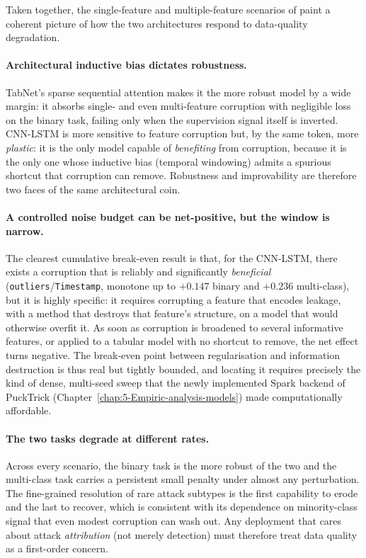 \documentclass[../main.tex]{subfiles}
\begin{document}
Taken together, the single-feature and multiple-feature scenarios of  paint a coherent picture of how the two architectures respond to data-quality degradation.

\paragraph{Architectural inductive bias dictates robustness.}
TabNet's sparse sequential attention makes it the more robust model by a wide margin: it absorbs single- and even multi-feature corruption with negligible loss on the binary task, failing only when the supervision signal itself is inverted. CNN-LSTM is more sensitive to feature corruption but, by the same token, more \emph{plastic}: it is the only model capable of \emph{benefiting} from corruption, because it is the only one whose inductive bias (temporal windowing) admits a spurious shortcut that corruption can remove. Robustness and improvability are therefore two faces of the same architectural coin.

\paragraph{A controlled noise budget can be net-positive, but the window is narrow.}
The clearest cumulative break-even result is that, for the CNN-LSTM, there exists a corruption that is reliably and significantly \emph{beneficial} (\texttt{outliers}/\texttt{Timestamp}, monotone up to $+0.147$ binary and $+0.236$ multi-class), but it is highly specific: it requires corrupting a feature that encodes leakage, with a method that destroys that feature's structure, on a model that would otherwise overfit it. As soon as corruption is broadened to several informative features, or applied to a tabular model with no shortcut to remove, the net effect turns negative. The break-even point between regularisation and information destruction is thus real but tightly bounded, and locating it requires precisely the kind of dense, multi-seed sweep that the newly implemented Spark backend of PuckTrick (Chapter~\ref{chap:5-Empiric-analysis-models}) made computationally affordable.

\paragraph{The two tasks degrade at different rates.}
Across every scenario, the binary task is the more robust of the two and the multi-class task carries a persistent small penalty under almost any perturbation. The fine-grained resolution of rare attack subtypes is the first capability to erode and the last to recover, which is consistent with its dependence on minority-class signal that even modest corruption can wash out. Any deployment that cares about attack \emph{attribution} (not merely detection) must therefore treat data quality as a first-order concern.
\end{document}
